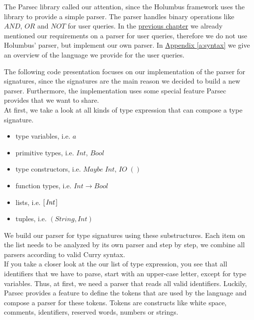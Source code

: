 \documentclass[%
	pdftex,%
	a4paper,%
	oneside,%
	chapterprefix,%
	headsepline,%
	12pt%
]{scrbook}
\newcommand{\Conid}[1]{\mathit{#1}}
\newcommand{\Varid}[1]{\mathit{#1}}
\begin{document}
The Parsec library called our attention, since the Holumbus framework
uses the library to provide a simple parser. %
The parser handles binary operations like \ensuremath{\Conid{AND}}, \ensuremath{\Conid{OR}} and \ensuremath{\Conid{NOT}} for
user queries. %
In the \hyperref[analysis:parser]{previous chapter} we already
mentioned our requirements on a parser for user queries, therefore we
do not use Holumbus' parser, but implement our own parser. %
In \hyperref[a:syntax]{Appendix \ref{a:syntax}} we give an overview of
the language we provide for the user queries. %

The following code presentation focuses on our implementation of the
parser for signatures, since the signatures are the main reason we
decided to build a new parser. %
Furthermore, the implementation uses some special feature Parsec
provides that we want to share. \\ %

At first, we take a look at all kinds of type expression that can
compose a type signature. %

\begin{itemize}
\item type variables, i.e. \ensuremath{\Varid{a}}
\item primitive types, i.e. \ensuremath{\Conid{Int}}, \ensuremath{\Conid{Bool}}
\item type constructors, i.e. \ensuremath{\Conid{Maybe}\;\Conid{Int}}, \ensuremath{\Conid{IO}\;()}
\item function types, i.e. \ensuremath{\Conid{Int}\to \Conid{Bool}}
\item lists, i.e. \ensuremath{[\mskip1.5mu \Conid{Int}\mskip1.5mu]}
\item tuples, i.e. \ensuremath{(\Conid{String},\Conid{Int})}
\end{itemize}

We build our parser for type signatures using these substructures. %
Each item on the list needs to be analyzed by its own parser and step
by step, we combine all parsers according to valid Curry syntax. \\

If you take a closer look at the our list of type expression, you see
that all identifiers that we have to parse, start with an upper-case
letter, except for type variables. %
Thus, at first, we need a parser that reads all valid identifiers. %
Luckily, Parsec provides a feature to define the tokens that are used
by the language and compose a parser for these tokens. %
Tokens are constructs like white space, comments, identifiers,
reserved words, numbers or strings. %
\end{document}
